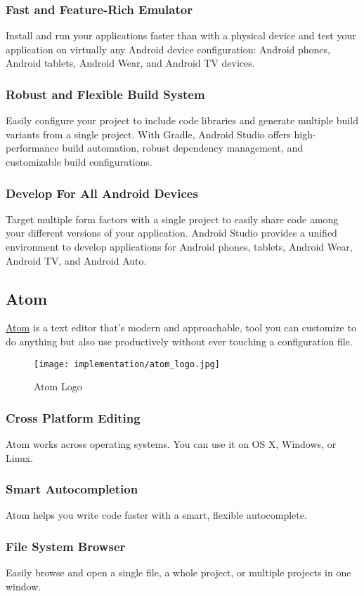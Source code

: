 	\subsubsection{Fast and Feature-Rich Emulator}
		Install and run your applications faster than with a physical device and test your application on virtually any Android device configuration: Android phones, Android tablets, Android Wear, and Android TV devices.
	\subsubsection{Robust and Flexible Build System}
		Easily configure your project to include code libraries and generate multiple build variants from a single project. With Gradle, Android Studio offers high-performance build automation, robust dependency management, and customizable build configurations.
	\subsubsection{Develop For All Android Devices}
		Target multiple form factors with a single project to easily share code among your different versions of your application. Android Studio provides a unified environment to develop applications for Android phones, tablets, Android Wear, Android TV, and Android Auto.
		
\subsection{Atom}
	\href{https://www.atom.io}{Atom} is a text editor that's modern and approachable, tool you can customize to do anything but also use productively without ever touching a configuration file.\cite{atom}
	\begin{figure}[ht]
		\centering
		\texttt{[image: implementation/atom\_logo.jpg]}
		\caption{Atom Logo}
	\end{figure}
	\subsubsection{Cross Platform Editing}
		Atom works across operating systems. You can use it on OS X, Windows, or Linux.
	\subsubsection{Smart Autocompletion}
		Atom helps you write code faster with a smart, flexible autocomplete.
	\subsubsection{File System Browser}
		Easily browse and open a single file, a whole project, or multiple projects in one window.
